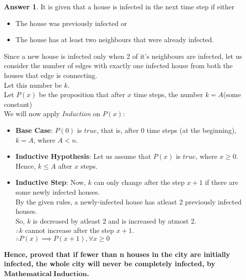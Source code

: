 \documentclass[a4paper]{article}
\theoremstyle{definition}
\newtheorem{answer}{Answer}
\begin{document}
\begin{answer}
    It is given that a house is infected in the next time step if either
    \begin{itemize}
        \item The house was previously infected or
        \item The house has at least two neighbours that were already infected.
    \end{itemize}
    Since a new house is infected only when 2 of it's neighbours are infected, let us consider the number of edges with exactly one infected house from both the houses that edge is connecting.\\
    Let this number be $k$.\\
    Let $P(x)$ be the proposition that after $x$ time steps, the number $k = A$(some constant)\\
    We will now apply \textit{Induction} on $P(x)$:
    \begin{itemize}
        \item \textbf{Base Case}: $P(0)$ is $true$, that is, after $0$ time steps (at the beginning), $k = A$, where $A < n$.
        \item \textbf{Inductive Hypothesis}: Let us assume that $P(x)$ is $true$, where $x \ge 0$. Hence, $k \le A$ after $x$ steps.
        \item \textbf{Inductive Step}: Now, $k$ can only change after the step $x + 1$ if there are some newly infected houses.\\
        By the given rules, a newly-infected house has atleast 2 previously infected houses.\\
        So, $k$ is decreased by atleast 2 and is increased by atmost 2.\\
        $\therefore k$ cannot increase after the step $x + 1$.\\
        $\therefore P(x) \implies P(x + 1), \forall x \ge 0$\\
       \end{itemize}
        \textbf{Hence, proved that if fewer than n houses
in the city are initially infected, the whole city will never be completely infected, by $\boldsymbol{Mathematical \; Induction}$.}
    
    
\end{answer}
\end{document}
